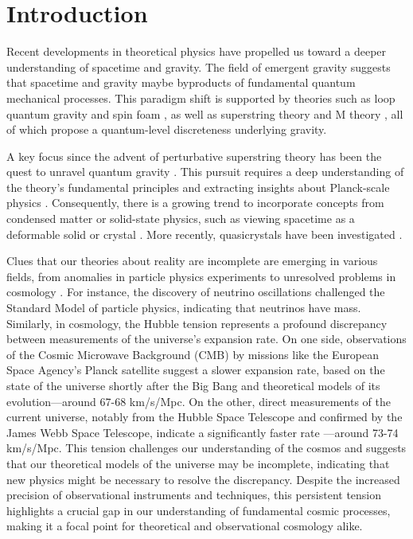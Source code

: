 \documentclass[sn-mathphys-num]{sn-jnl}%
\begin{document}
\section{Introduction}
\label{intro}

Recent developments in theoretical physics have propelled us toward a deeper understanding of spacetime and gravity. The field of emergent gravity \cite{Verlinde2011} suggests that spacetime and gravity maybe byproducts of fundamental quantum mechanical processes. This paradigm shift is supported by theories such as loop quantum gravity and spin foam \cite{Rovelli-Vidotto-Book}, as well as superstring theory and M theory \cite{stringbook1}, all of which propose a quantum-level discreteness underlying gravity.

A key focus since the advent of perturbative superstring theory has been the quest to unravel quantum gravity \cite{Kiefer}. This pursuit requires a deep understanding of the theory’s fundamental principles and extracting insights about Planck-scale physics \cite{Rovelli1998}. Consequently, there is a growing trend to incorporate concepts from condensed matter or solid-state physics, such as viewing spacetime as a deformable solid or crystal \cite{Tahim2009}. More recently, quasicrystals have been investigated \cite{Amaral:2023mgf,modelsetemergence}.


Clues that our theories about reality are incomplete are emerging in various fields, from anomalies in particle physics experiments to unresolved problems in cosmology \cite{lawsofnature}. For instance, the discovery of neutrino oscillations challenged the Standard Model of particle physics, indicating that neutrinos have mass. Similarly, in cosmology, the Hubble tension \cite{hubbletension} represents a profound discrepancy between measurements of the universe's expansion rate. On one side, observations of the Cosmic Microwave Background (CMB) by missions like the European Space Agency's Planck satellite suggest a slower expansion rate, based on the state of the universe shortly after the Big Bang and theoretical models of its evolution—around 67-68 km/s/Mpc. On the other, direct measurements of the current universe, notably from the Hubble Space Telescope and confirmed by the James Webb Space Telescope, indicate a significantly faster rate \cite{hubble}—around 73-74 km/s/Mpc. This tension challenges our understanding of the cosmos and suggests that our theoretical models of the universe may be incomplete, indicating that new physics might be necessary to resolve the discrepancy. Despite the increased precision of observational instruments and techniques, this persistent tension highlights a crucial gap in our understanding of fundamental cosmic processes, making it a focal point for theoretical and observational cosmology alike.
\end{document}

